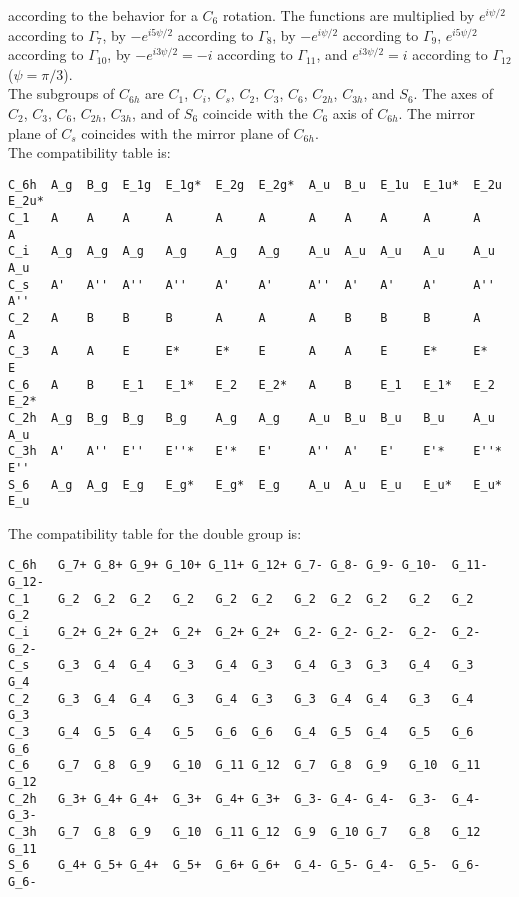 \documentclass[12pt,a4paper]{article}
\begin{document}
according to the behavior for a $C_6$ rotation.
The functions are multiplied by $e^{i\psi/2}$ according to $\Gamma_7$, 
by $-e^{i5\psi/2}$ according to $\Gamma_8$, by $-e^{i\psi/2}$ according 
to $\Gamma_9$, $e^{i5\psi/2}$ according to $\Gamma_{10}$, by $-e^{i3\psi/2}=-i$ 
according to $\Gamma_{11}$, and $e^{i3\psi/2}=i$ according 
to $\Gamma_{12}$ ($\psi=\pi/3$). \\
The subgroups of $C_{6h}$ are $C_1$, $C_i$, $C_s$, $C_2$, $C_3$, $C_6$, 
$C_{2h}$, $C_{3h}$, and $S_6$. The axes of $C_2$, $C_3$, $C_6$, $C_{2h}$, 
$C_{3h}$, and of $S_6$ coincide with the $C_6$ axis of $C_{6h}$. The mirror 
plane of $C_s$ coincides with the mirror plane of $C_{6h}$.\\
The compatibility table is:
\begin{footnotesize}
\begin{verbatim}
C_6h  A_g  B_g  E_1g  E_1g*  E_2g  E_2g*  A_u  B_u  E_1u  E_1u*  E_2u  E_2u*
C_1   A    A    A     A      A     A      A    A    A     A      A     A
C_i   A_g  A_g  A_g   A_g    A_g   A_g    A_u  A_u  A_u   A_u    A_u   A_u
C_s   A'   A''  A''   A''    A'    A'     A''  A'   A'    A'     A''   A''
C_2   A    B    B     B      A     A      A    B    B     B      A     A
C_3   A    A    E     E*     E*    E      A    A    E     E*     E*    E
C_6   A    B    E_1   E_1*   E_2   E_2*   A    B    E_1   E_1*   E_2   E_2*
C_2h  A_g  B_g  B_g   B_g    A_g   A_g    A_u  B_u  B_u   B_u    A_u   A_u
C_3h  A'   A''  E''   E''*   E'*   E'     A''  A'   E'    E'*    E''*  E'' 
S_6   A_g  A_g  E_g   E_g*   E_g*  E_g    A_u  A_u  E_u   E_u*   E_u*  E_u
\end{verbatim}
\end{footnotesize}
The compatibility table for the double group is:
\begin{footnotesize}
\begin{verbatim}
C_6h   G_7+ G_8+ G_9+ G_10+ G_11+ G_12+ G_7- G_8- G_9- G_10-  G_11- G_12-
C_1    G_2  G_2  G_2   G_2   G_2  G_2   G_2  G_2  G_2   G_2   G_2   G_2
C_i    G_2+ G_2+ G_2+  G_2+  G_2+ G_2+  G_2- G_2- G_2-  G_2-  G_2-  G_2-  
C_s    G_3  G_4  G_4   G_3   G_4  G_3   G_4  G_3  G_3   G_4   G_3   G_4
C_2    G_3  G_4  G_4   G_3   G_4  G_3   G_3  G_4  G_4   G_3   G_4   G_3    
C_3    G_4  G_5  G_4   G_5   G_6  G_6   G_4  G_5  G_4   G_5   G_6   G_6  
C_6    G_7  G_8  G_9   G_10  G_11 G_12  G_7  G_8  G_9   G_10  G_11  G_12 
C_2h   G_3+ G_4+ G_4+  G_3+  G_4+ G_3+  G_3- G_4- G_4-  G_3-  G_4-  G_3-   
C_3h   G_7  G_8  G_9   G_10  G_11 G_12  G_9  G_10 G_7   G_8   G_12  G_11 
S_6    G_4+ G_5+ G_4+  G_5+  G_6+ G_6+  G_4- G_5- G_4-  G_5-  G_6-  G_6-
\end{verbatim}
\end{footnotesize}
\end{document}
